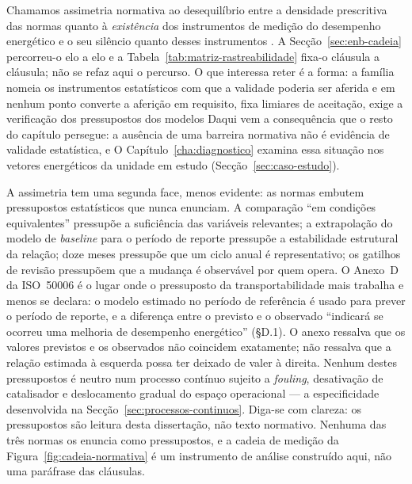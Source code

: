Chamamos assimetria normativa ao desequilíbrio entre a densidade
prescritiva das normas quanto à \emph{existência} dos instrumentos de
medição do desempenho energético e o seu silêncio quanto  desses instrumentos . A Secção~\ref{sec:enb-cadeia} percorreu-o elo a elo e a
Tabela~\ref{tab:matriz-rastreabilidade} fixa-o cláusula a cláusula; não se
refaz aqui o percurso. O que interessa reter é a forma: a família nomeia os
instrumentos estatísticos com que a validade poderia ser aferida e em nenhum
ponto converte a aferição em requisito, fixa limiares de aceitação, exige a
verificação dos pressupostos dos modelos  Daqui vem a
consequência que o resto do capítulo persegue: a ausência de uma barreira
normativa não é evidência de validade estatística, e  O
Capítulo~\ref{cha:diagnostico} examina essa situação nos vetores energéticos
da unidade em estudo (Secção~\ref{sec:caso-estudo}).

A assimetria tem uma segunda face, menos evidente: as normas embutem pressupostos estatísticos que nunca enunciam. A comparação \enquote{em condições equivalentes} pressupõe a suficiência das variáveis relevantes; a extrapolação do modelo de \emph{baseline} para o período de reporte pressupõe a estabilidade estrutural da relação;  doze meses  pressupõe que um ciclo anual é representativo; os gatilhos de revisão pressupõem que a mudança é observável por quem opera. O Anexo~D da ISO~50006 é o lugar onde o pressuposto da transportabilidade mais trabalha e menos se declara: o modelo estimado no período de referência é usado para prever o período de reporte, e a diferença entre o previsto e o observado \enquote{indicará se ocorreu uma melhoria de desempenho energético} (\S D.1). O anexo ressalva que os valores previstos e os observados não coincidem exatamente; não ressalva que a relação estimada à esquerda possa ter deixado de valer à direita. Nenhum destes pressupostos é neutro num processo contínuo sujeito a
\emph{fouling}, desativação de catalisador e deslocamento gradual do espaço
operacional --- a especificidade desenvolvida na
Secção~\ref{sec:processos-continuos}. Diga-se com clareza: os
pressupostos são leitura desta dissertação, não texto normativo. Nenhuma das
três normas os enuncia como pressupostos, e a cadeia de medição da
Figura~\ref{fig:cadeia-normativa} é um instrumento de análise construído
aqui, não uma paráfrase das cláusulas.

